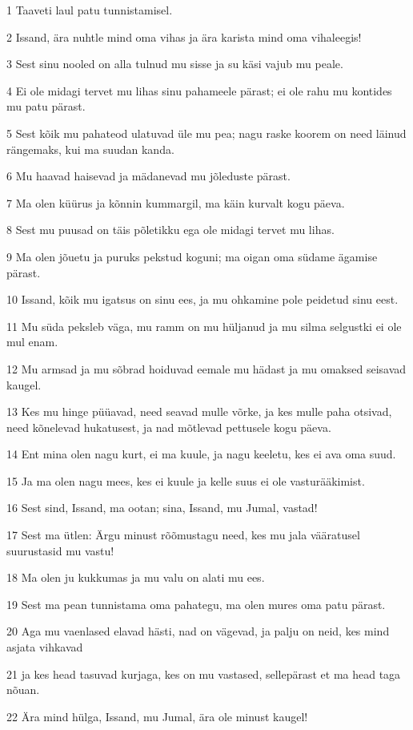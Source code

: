 \par 1 Taaveti laul patu tunnistamisel.
\par 2 Issand, ära nuhtle mind oma vihas ja ära karista mind oma vihaleegis!
\par 3 Sest sinu nooled on alla tulnud mu sisse ja su käsi vajub mu peale.
\par 4 Ei ole midagi tervet mu lihas sinu pahameele pärast; ei ole rahu mu kontides mu patu pärast.
\par 5 Sest kõik mu pahateod ulatuvad üle mu pea; nagu raske koorem on need läinud rängemaks, kui ma suudan kanda.
\par 6 Mu haavad haisevad ja mädanevad mu jõleduste pärast.
\par 7 Ma olen küürus ja kõnnin kummargil, ma käin kurvalt kogu päeva.
\par 8 Sest mu puusad on täis põletikku ega ole midagi tervet mu lihas.
\par 9 Ma olen jõuetu ja puruks pekstud koguni; ma oigan oma südame ägamise pärast.
\par 10 Issand, kõik mu igatsus on sinu ees, ja mu ohkamine pole peidetud sinu eest.
\par 11 Mu süda peksleb väga, mu ramm on mu hüljanud ja mu silma selgustki ei ole mul enam.
\par 12 Mu armsad ja mu sõbrad hoiduvad eemale mu hädast ja mu omaksed seisavad kaugel.
\par 13 Kes mu hinge püüavad, need seavad mulle võrke, ja kes mulle paha otsivad, need kõnelevad hukatusest, ja nad mõtlevad pettusele kogu päeva.
\par 14 Ent mina olen nagu kurt, ei ma kuule, ja nagu keeletu, kes ei ava oma suud.
\par 15 Ja ma olen nagu mees, kes ei kuule ja kelle suus ei ole vasturääkimist.
\par 16 Sest sind, Issand, ma ootan; sina, Issand, mu Jumal, vastad!
\par 17 Sest ma ütlen: Ärgu minust rõõmustagu need, kes mu jala vääratusel suurustasid mu vastu!
\par 18 Ma olen ju kukkumas ja mu valu on alati mu ees.
\par 19 Sest ma pean tunnistama oma pahategu, ma olen mures oma patu pärast.
\par 20 Aga mu vaenlased elavad hästi, nad on vägevad, ja palju on neid, kes mind asjata vihkavad
\par 21 ja kes head tasuvad kurjaga, kes on mu vastased, sellepärast et ma head taga nõuan.
\par 22 Ära mind hülga, Issand, mu Jumal, ära ole minust kaugel!

